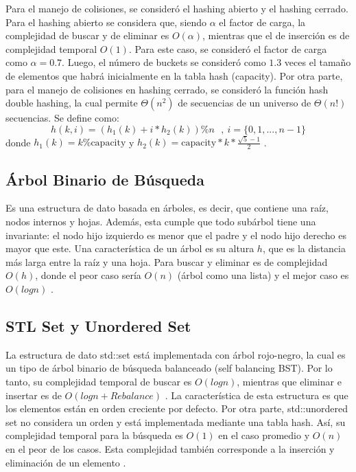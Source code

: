 \begin{multicols}{2}
Para el manejo de colisiones, se consideró el hashing abierto y el hashing cerrado. Para el hashing abierto se considera que, siendo $\alpha$ el factor de carga, la complejidad de buscar y de eliminar es $O(\alpha)$, mientras que el de inserción es de complejidad temporal $O(1)$. Para este caso, se consideró el factor de carga como $\alpha = 0.7$. Luego, el número de buckets se consideró como $1.3$ veces el tamaño de elementos que habrá inicialmente en la tabla hash (capacity). Por otra parte, para el manejo de colisiones en hashing cerrado, se consideró la función hash double hashing, la cual permite $\Theta(n^2)$ de secuencias de un universo de $\Theta(n!)$ secuencias. Se define como:
\begin{equation*}
    h(k,i) = (h_1(k) + i*h_2(k))\%n \ \ \ , \ i=\{0,1,...,n-1\}
\end{equation*}
donde $h_1(k) = k\% \text{capacity}$ y $h_2(k) =\text{capacity} * k * \frac{\sqrt{5} - 1}{2}$ \cite{doublehashing}. 
\subsection{Árbol Binario de Búsqueda}
Es una estructura de dato basada en árboles, es decir, que contiene una raíz, nodos internos y hojas. Además, esta cumple que todo subárbol tiene una invariante: el nodo hijo izquierdo es menor que el padre y el nodo hijo derecho es mayor que este. Una característica de un árbol es su altura $h$, que es la distancia más larga entre la raíz y una hoja. Para buscar y eliminar es de complejidad $O(h)$, donde el peor caso sería $O(n)$ (árbol como una lista) y el mejor caso es $O(logn)$ \cite{AnswaCode}.
\subsection{STL Set y Unordered Set}

La estructura de dato std::set está implementada con árbol rojo-negro, la cual es un tipo de árbol binario de búsqueda balanceado (self balancing BST). Por lo tanto, su complejidad temporal de buscar es $O(log n)$, mientras que eliminar e insertar es de $O(logn + Rebalance)$ \cite{cpprefence_set}. La característica de esta estructura es que los elementos están en orden creciente por defecto. Por otra parte, std::unordered set no considera un orden y está implementada mediante una tabla hash. Así, su complejidad temporal para la búsqueda es $O(1)$ en el caso promedio y $O(n)$ en el peor de los casos. Esta complejidad también corresponde a la inserción y eliminación de un elemento \cite{cpprefence_unset}.


\end{multicols}
